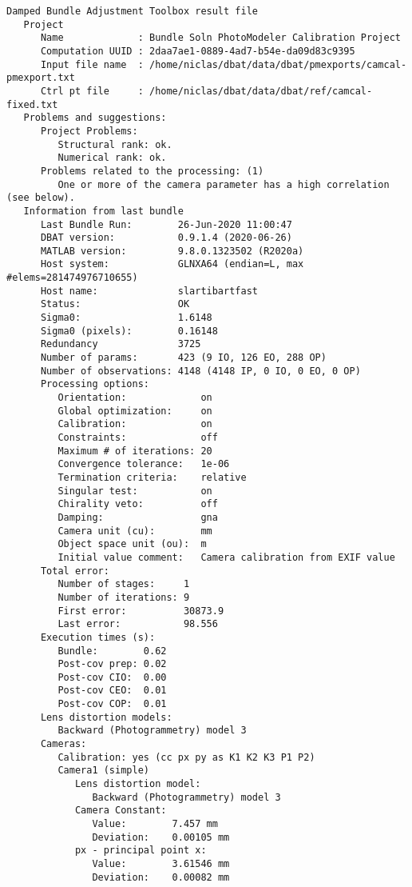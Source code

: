 \documentclass{article}
\begin{document}
\begin{verbatim}
Damped Bundle Adjustment Toolbox result file
   Project
      Name             : Bundle Soln PhotoModeler Calibration Project
      Computation UUID : 2daa7ae1-0889-4ad7-b54e-da09d83c9395
      Input file name  : /home/niclas/dbat/data/dbat/pmexports/camcal-pmexport.txt
      Ctrl pt file     : /home/niclas/dbat/data/dbat/ref/camcal-fixed.txt
   Problems and suggestions:
      Project Problems:
         Structural rank: ok.
         Numerical rank: ok.
      Problems related to the processing: (1)
         One or more of the camera parameter has a high correlation (see below).
   Information from last bundle
      Last Bundle Run:        26-Jun-2020 11:00:47
      DBAT version:           0.9.1.4 (2020-06-26)
      MATLAB version:         9.8.0.1323502 (R2020a)
      Host system:            GLNXA64 (endian=L, max #elems=281474976710655)
      Host name:              slartibartfast
      Status:                 OK
      Sigma0:                 1.6148
      Sigma0 (pixels):        0.16148
      Redundancy              3725
      Number of params:       423 (9 IO, 126 EO, 288 OP)
      Number of observations: 4148 (4148 IP, 0 IO, 0 EO, 0 OP)
      Processing options:
         Orientation:             on
         Global optimization:     on
         Calibration:             on
         Constraints:             off
         Maximum # of iterations: 20
         Convergence tolerance:   1e-06
         Termination criteria:    relative
         Singular test:           on
         Chirality veto:          off
         Damping:                 gna
         Camera unit (cu):        mm
         Object space unit (ou):  m
         Initial value comment:   Camera calibration from EXIF value
      Total error:
         Number of stages:     1
         Number of iterations: 9
         First error:          30873.9
         Last error:           98.556
      Execution times (s):
         Bundle:        0.62
         Post-cov prep: 0.02
         Post-cov CIO:  0.00
         Post-cov CEO:  0.01
         Post-cov COP:  0.01
      Lens distortion models:
         Backward (Photogrammetry) model 3
      Cameras:
         Calibration: yes (cc px py as K1 K2 K3 P1 P2)
         Camera1 (simple)
            Lens distortion model:
               Backward (Photogrammetry) model 3
            Camera Constant:
               Value:        7.457 mm
               Deviation:    0.00105 mm
            px - principal point x:
               Value:        3.61546 mm
               Deviation:    0.00082 mm

\end{verbatim}
\end{document}
